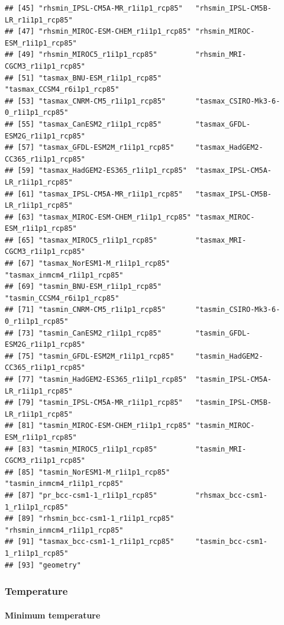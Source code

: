 \documentclass[
  paper=a4,
  ,captions=tableheading
]{scrartcl}
\begin{document}
\begin{verbatim}
## [45] "rhsmin_IPSL-CM5A-MR_r1i1p1_rcp85"   "rhsmin_IPSL-CM5B-LR_r1i1p1_rcp85"  
## [47] "rhsmin_MIROC-ESM-CHEM_r1i1p1_rcp85" "rhsmin_MIROC-ESM_r1i1p1_rcp85"     
## [49] "rhsmin_MIROC5_r1i1p1_rcp85"         "rhsmin_MRI-CGCM3_r1i1p1_rcp85"     
## [51] "tasmax_BNU-ESM_r1i1p1_rcp85"        "tasmax_CCSM4_r6i1p1_rcp85"         
## [53] "tasmax_CNRM-CM5_r1i1p1_rcp85"       "tasmax_CSIRO-Mk3-6-0_r1i1p1_rcp85" 
## [55] "tasmax_CanESM2_r1i1p1_rcp85"        "tasmax_GFDL-ESM2G_r1i1p1_rcp85"    
## [57] "tasmax_GFDL-ESM2M_r1i1p1_rcp85"     "tasmax_HadGEM2-CC365_r1i1p1_rcp85" 
## [59] "tasmax_HadGEM2-ES365_r1i1p1_rcp85"  "tasmax_IPSL-CM5A-LR_r1i1p1_rcp85"  
## [61] "tasmax_IPSL-CM5A-MR_r1i1p1_rcp85"   "tasmax_IPSL-CM5B-LR_r1i1p1_rcp85"  
## [63] "tasmax_MIROC-ESM-CHEM_r1i1p1_rcp85" "tasmax_MIROC-ESM_r1i1p1_rcp85"     
## [65] "tasmax_MIROC5_r1i1p1_rcp85"         "tasmax_MRI-CGCM3_r1i1p1_rcp85"     
## [67] "tasmax_NorESM1-M_r1i1p1_rcp85"      "tasmax_inmcm4_r1i1p1_rcp85"        
## [69] "tasmin_BNU-ESM_r1i1p1_rcp85"        "tasmin_CCSM4_r6i1p1_rcp85"         
## [71] "tasmin_CNRM-CM5_r1i1p1_rcp85"       "tasmin_CSIRO-Mk3-6-0_r1i1p1_rcp85" 
## [73] "tasmin_CanESM2_r1i1p1_rcp85"        "tasmin_GFDL-ESM2G_r1i1p1_rcp85"    
## [75] "tasmin_GFDL-ESM2M_r1i1p1_rcp85"     "tasmin_HadGEM2-CC365_r1i1p1_rcp85" 
## [77] "tasmin_HadGEM2-ES365_r1i1p1_rcp85"  "tasmin_IPSL-CM5A-LR_r1i1p1_rcp85"  
## [79] "tasmin_IPSL-CM5A-MR_r1i1p1_rcp85"   "tasmin_IPSL-CM5B-LR_r1i1p1_rcp85"  
## [81] "tasmin_MIROC-ESM-CHEM_r1i1p1_rcp85" "tasmin_MIROC-ESM_r1i1p1_rcp85"     
## [83] "tasmin_MIROC5_r1i1p1_rcp85"         "tasmin_MRI-CGCM3_r1i1p1_rcp85"     
## [85] "tasmin_NorESM1-M_r1i1p1_rcp85"      "tasmin_inmcm4_r1i1p1_rcp85"        
## [87] "pr_bcc-csm1-1_r1i1p1_rcp85"         "rhsmax_bcc-csm1-1_r1i1p1_rcp85"    
## [89] "rhsmin_bcc-csm1-1_r1i1p1_rcp85"     "rhsmin_inmcm4_r1i1p1_rcp85"        
## [91] "tasmax_bcc-csm1-1_r1i1p1_rcp85"     "tasmin_bcc-csm1-1_r1i1p1_rcp85"    
## [93] "geometry"
\end{verbatim}

\hypertarget{temperature}{%
\subsubsection{Temperature}\label{temperature}}

\hypertarget{minimum-temperature}{%
\paragraph{Minimum temperature}\label{minimum-temperature}}
\end{document}
